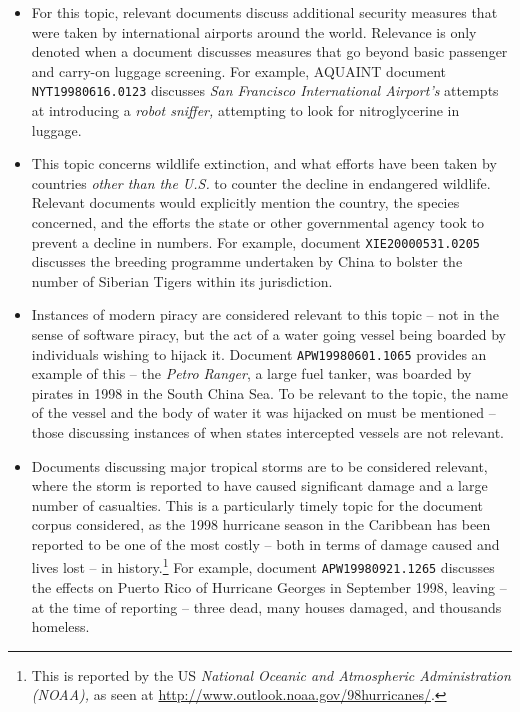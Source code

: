 \begin{itemize}
    
    \item{ For this topic, relevant documents discuss additional security measures that were taken by international airports around the world. Relevance is only denoted when a document discusses measures that go beyond basic passenger and carry-on luggage screening. For example, AQUAINT document \texttt{NYT19980616.0123} discusses \emph{San Francisco International Airport's} attempts at introducing a \emph{robot sniffer,} attempting to look for nitroglycerine in luggage.}
    
    \item{ This topic concerns wildlife extinction, and what efforts have been taken by countries \emph{other than the U.S.} to counter the decline in endangered wildlife. Relevant documents would explicitly mention the country, the species concerned, and the efforts the state or other governmental agency took to prevent a decline in numbers. For example, document \texttt{XIE20000531.0205} discusses the breeding programme undertaken by China to bolster the number of Siberian Tigers within its jurisdiction.}
    
    \item{ Instances of modern piracy are considered relevant to this topic -- not in the sense of software piracy, but the act of a water going vessel being boarded by individuals wishing to hijack it. Document \texttt{APW19980601.1065} provides an example of this -- the \emph{Petro Ranger}, a large fuel tanker, was boarded by pirates in 1998 in the South China Sea. To be relevant to the topic, the name of the vessel and the body of water it was hijacked on must be mentioned -- those discussing instances of when states intercepted vessels are not relevant.}
    
    \item{ Documents discussing major tropical storms are to be considered relevant, where the storm is reported to have caused significant damage and a large number of casualties. This is a particularly timely topic for the document corpus considered, as the 1998 hurricane season in the Caribbean has been reported to be one of the most costly -- both in terms of damage caused and lives lost -- in history.\footnote{This is reported by the US \emph{National Oceanic and Atmospheric Administration (NOAA),} as seen at \url{http://www.outlook.noaa.gov/98hurricanes/}. } For example, document \texttt{APW19980921.1265} discusses the effects on Puerto Rico of Hurricane Georges in September 1998, leaving -- at the time of reporting -- three dead, many houses damaged, and thousands homeless.}
    

\end{itemize}
